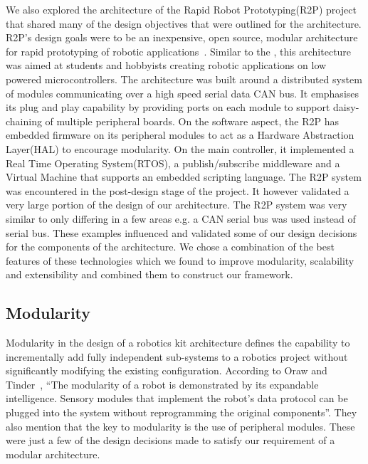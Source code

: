 We also explored the architecture of the Rapid Robot Prototyping(R2P) project that shared many of the design objectives that were outlined for the \xten architecture. R2P's design goals were to be an inexpensive, open source, modular architecture for rapid prototyping of robotic applications~\parencite{r2p}. Similar to the \xten, this architecture was aimed at students and hobbyists creating robotic applications on low powered microcontrollers. The architecture was built around a distributed system of modules communicating over a high speed serial data CAN bus. It emphasises its plug and play capability by providing ports on each module to support daisy-chaining of multiple peripheral boards. On the software aspect, the R2P has embedded firmware on its peripheral modules to act as a Hardware Abstraction Layer(HAL) to encourage modularity. On the main controller, it implemented a Real Time Operating System(RTOS), a publish/subscribe middleware and a Virtual Machine that supports an embedded scripting language. The R2P system was encountered in the post-design stage of the \xten project. It however validated a very large portion of the design of our architecture. The R2P system was very similar to \xten only differing in a few areas e.g. a CAN serial bus was used instead of \iic serial bus. 
%
%
These examples influenced and validated some of our design decisions for the components of the \xten architecture. We chose a combination of the best features of these technologies which we found to improve modularity, scalability and extensibility and combined them to construct our framework. 






\subsection{Modularity} %
\label{sub:modularity}
Modularity in the design of a robotics kit architecture defines the capability to incrementally add fully independent sub-systems to a robotics project without significantly modifying the existing configuration. According to Oraw and Tinder~\parencite{mars}, ``The modularity of a robot is demonstrated by its expandable intelligence. Sensory modules that implement the robot's data protocol can be plugged into the system without reprogramming the original components''. They also mention that the key to modularity is the use of peripheral modules. These were just a few of the design decisions made to satisfy our requirement of a modular architecture. 

